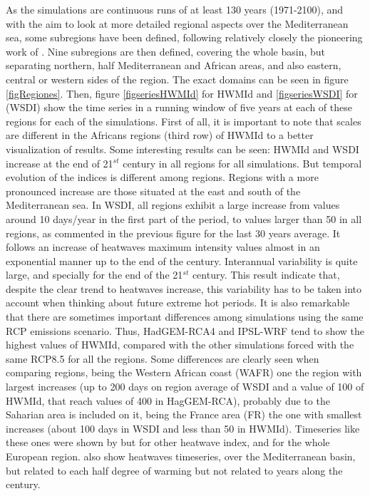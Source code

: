 As the simulations are continuous runs of at least 130 years (1971-2100), and with the aim to look at more detailed regional aspects over the Mediterranean sea, some subregions have been defined, following relatively closely
the pioneering work of \cite{gio_lio2008}. Nine subregions are then defined, covering the whole basin, but separating northern, half Mediterranean and African areas,
and also eastern, central or western sides of the region. The exact domains can be seen in figure \ref{figRegiones}. Then, figure \ref{figseriesHWMId} for HWMId and \ref{figseriesWSDI} for (WSDI) show the time series in a running window of five years at each of these regions for each of the simulations.
First of all, it is important to note that scales are different in the Africans regions (third row) of HWMId to a better visualization of results. Some interesting results can be seen: HWMId and WSDI increase at the end of 21$^{st}$ century in all regions for all simulations. But temporal evolution of the indices is different among regions. Regions with a more pronounced increase are those situated at the east and south of the Mediterranean sea. In WSDI, all regions exhibit a large increase from values around 10 days/year in the first part of the period, to values larger than 50 in all regions, as commented in the previous figure for
the last 30 years average. It follows an increase of heatwaves maximum intensity values almost in an exponential
manner up to the end of the century. 
Interannual variability is quite large, and specially for the end of the 21$^{st}$
century. This result indicate that, despite the clear trend to heatwaves increase, this variability has to be taken into account when thinking about
future extreme hot periods. It is also remarkable that there are
sometimes important differences among simulations using the same
RCP emissions scenario. Thus, HadGEM-RCA4 and IPSL-WRF
tend to show the highest values of HWMId, compared with the other 
simulations forced with the same RCP8.5 for all the regions. 
Some differences are clearly seen when comparing regions,
being the Western African coast (WAFR) one the region with largest
increases (up to 200 days on region average of WSDI and a value of 100 of HWMId, that reach values of 400 in HagGEM-RCA), probably due to the 
Saharian area is included on it, 
being the France area (FR)
the one with smallest increases (about 100 days in WSDI and less than 50 in HWMId). 
Timeseries like these ones were shown by \cite{rus_al2014} but for other
heatwave index, and for the whole European region. \cite{per_gib2017}
also show heatwaves timeseries, over the Mediterranean basin,
but related to each half degree of warming but not related to
years along the century.


